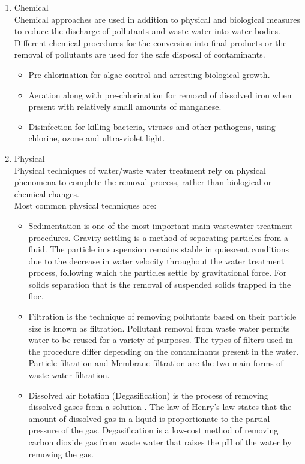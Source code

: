 \documentclass{article}
\begin{document}
\begin{enumerate}
\item Chemical\\

Chemical approaches are used in addition to physical and biological measures to reduce the discharge of pollutants and waste water into water bodies. Different chemical procedures for the conversion into final products or the removal of pollutants are used for the safe disposal of contaminants.\\
\begin{itemize}
\item Pre-chlorination for algae control and arresting biological growth.
\item Aeration along with pre-chlorination for removal of dissolved iron when present with relatively small amounts of manganese.
\item Disinfection for killing bacteria, viruses and other pathogens, using chlorine, ozone and ultra-violet light.
\end{itemize}
\item Physical\\
Physical techniques of water/waste water treatment rely on physical phenomena to complete the removal process, rather than biological or chemical changes.\\
Most common physical techniques are:\\
\begin{itemize}
\item Sedimentation is one of the most important main wastewater treatment procedures. Gravity settling is a method of separating particles from a fluid. The particle in suspension remains stable in quiescent conditions due to the decrease in water velocity throughout the water treatment process, following which the particles settle by gravitational force. For solids separation that is the removal of suspended solids trapped in the floc.
\item Filtration is the technique of removing pollutants based on their particle size is known as filtration. Pollutant removal from waste water permits water to be reused for a variety of purposes. The types of filters used in the procedure differ depending on the contaminants present in the water. Particle filtration and Membrane filtration are the two main forms of waste water filtration.
\item Dissolved air flotation (Degasification) is the process of removing dissolved gases from a solution . The law of Henry's law states that the amount of dissolved gas in a liquid is proportionate to the partial pressure of the gas. Degasification is a low-cost method of removing carbon dioxide gas from waste water that raises the pH of the water by removing the gas. 

\end{itemize}
\end{enumerate}
\end{document}
